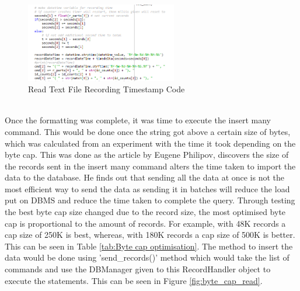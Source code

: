 \documentclass{report}
\begin{document}
\begin{figure}[h!]
    \centering
    \includegraphics[width=250]{read_text_file_recording_timestamp.PNG}
    \caption{Read Text File Recording Timestamp Code}
    \label{fig:read_txt_rec_timestamp}
\end{figure}{} \\ \clearpage
Once the formatting was complete, it was time to execute the insert many command. This would be done once the string got above a certain size of bytes, which was calculated from an experiment with the time it took depending on the byte cap. This was done as the article by Eugene Philipov\cite{insertRecords}, discovers the size of the records sent in the insert many command alters the time taken to import the data to the database. He finds out that sending all the data at once is not the most efficient way to send the data as sending it in batches will reduce the load put on DBMS and reduce the time taken to complete the query. Through testing the best byte cap size changed due to the record size, the most optimised byte cap is proportional to the amount of records. For example, with 48K records a cap size of 250K is best, whereas, with 180K records a cap size of 500K is better. This can be seen in Table \ref{tab:Byte cap optimisation}. The method to insert the data would be done using 'send\_records()' method which would take the list of commands and use the DBManager given to this RecordHandler object to execute the statements. This can be seen in Figure \ref{fig:byte_cap_read}.\\  \newline
\end{document}
